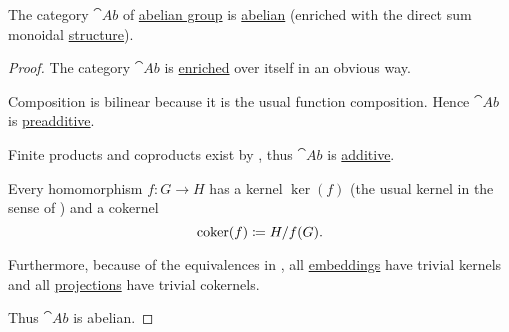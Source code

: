 \begin{proposition}\label{thm:ab_is_abelian}
  The category \( \cat{Ab} \) of \hyperref[def:abelian_group]{abelian group} is \hyperref[def:abelian_category]{abelian} (enriched with the direct sum monoidal \hyperref[thm:ab_is_monoidal]{structure}).
\end{proposition}
\begin{proof}
  The category \( \cat{Ab} \) is \hyperref[def:enriched_category]{enriched} over itself in an obvious way.

  Composition is bilinear because it is the usual function composition. Hence \( \cat{Ab} \) is \hyperref[def:preadditive_category]{preadditive}.

  Finite products and coproducts exist by , thus \( \cat{Ab} \) is \hyperref[def:additive_category]{additive}.

  Every homomorphism \( f: G \to H \) has a kernel \( \ker(f) \) (the usual kernel in the sense of ) and a cokernel
  \begin{equation*}
    \operatorname*{co\negthinspace\ker}(f) \coloneqq H / f(G).
  \end{equation*}

  Furthermore, because of the equivalences in , all \hyperref[def:first_order_homomorphism_invertibility/embedding]{embeddings} have trivial kernels and all \hyperref[def:first_order_homomorphism_invertibility/projection]{projections} have trivial cokernels.

  Thus \( \cat{Ab} \) is abelian.
\end{proof}

